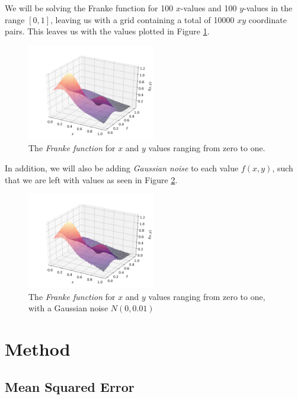 \documentclass[a4paper,10pt,english]{article}
\begin{document}
\begin{multicols*}{2}
We will be solving the Franke function for 100 $x$-values and 100 $y$-values in the range $[0,1]$, leaving us with a grid containing a total of 10000 $xy$ coordinate pairs.  This leaves us with the values plotted in Figure \ref{fig_Franke}.

\begin{figure}[H]
	\centering
	\includegraphics[width = 0.5\textwidth, center]{Franke.png}
	\caption{The \textit{Franke function} for $x$ and $y$ values ranging from zero to one. \label{fig_Franke}}
\end{figure}

In addition, we will also be adding \textit{Gaussian noise} to each value $f(x,y)$, such that we are left with values as seen in Figure \ref{fig_Franke_noise}.

\begin{figure}[H]
	\centering
	\includegraphics[width = 0.5\textwidth, center]{Franke_noise.png}
	\caption{The \textit{Franke function} for $x$ and $y$ values ranging from zero to one, with a Gaussian noise $N(0,0.01)$\label{fig_Franke_noise}}
\end{figure}

\section*{Method}

\subsection*{Mean Squared Error}


\end{multicols*}
\end{document}
